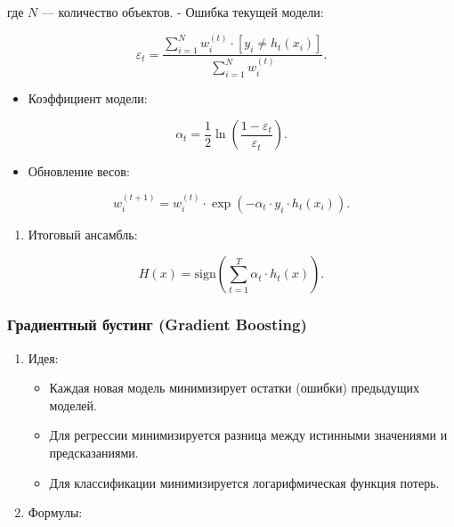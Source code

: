 \begin{enumerate}
где \(N\) --- количество объектов. - Ошибка текущей модели:

\begin{equation} 
     \varepsilon_t = \frac{\sum_{i=1}^N w_i^{(t)} \cdot [y_i \neq h_t(x_i)]}{\sum_{i=1}^N w_i^{(t)}}.
\end{equation}

\begin{itemize}
\tightlist
\item
  Коэффициент модели:
\end{itemize}

\begin{equation} 
     \alpha_t = \frac{1}{2} \ln\left(\frac{1 - \varepsilon_t}{\varepsilon_t}\right).
\end{equation}

\begin{itemize}
\tightlist
\item
  Обновление весов:
\end{itemize}

\begin{equation}
     w_i^{(t+1)} = w_i^{(t)} \cdot \exp\left(-\alpha_t \cdot y_i \cdot h_t(x_i)\right).
\end{equation}

\begin{enumerate}
\def\labelenumi{\arabic{enumi}.}
\setcounter{enumi}{2}
\tightlist
\item
  Итоговый ансамбль:
\end{enumerate}

\begin{equation}
   H(x) = \text{sign} \left( \sum_{t=1}^T \alpha_t \cdot h_t(x) \right).
\end{equation}

\hypertarget{ux433ux440ux430ux434ux438ux435ux43dux442ux43dux44bux439-ux431ux443ux441ux442ux438ux43dux433-gradient-boosting}{%
\subsubsection*{Градиентный бустинг (Gradient
Boosting)}\label{ux433ux440ux430ux434ux438ux435ux43dux442ux43dux44bux439-ux431ux443ux441ux442ux438ux43dux433-gradient-boosting}}

\begin{enumerate}
\def\labelenumi{\arabic{enumi}.}
\tightlist
\item
  Идея:

  \begin{itemize}
  \tightlist
  \item
    Каждая новая модель минимизирует остатки (ошибки) предыдущих
    моделей.
  \item
    Для регрессии минимизируется разница между истинными значениями и
    предсказаниями.
  \item
    Для классификации минимизируется логарифмическая функция потерь.
  \end{itemize}
\item
  Формулы:


\end{enumerate}
\end{enumerate}
